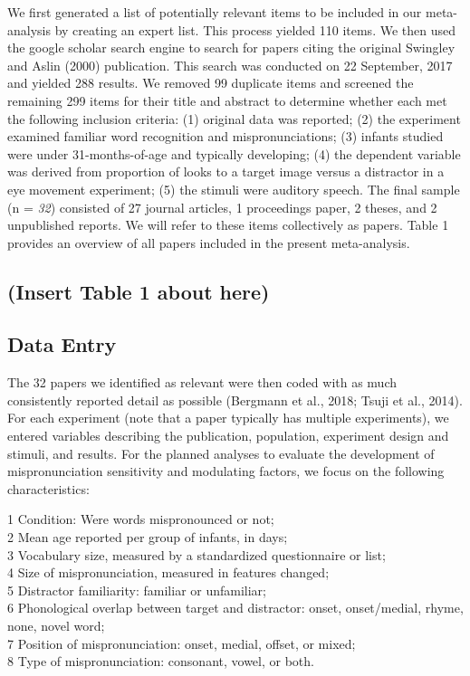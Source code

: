 \documentclass[man]{apa6}
\theoremstyle{definition}
\theoremstyle{definition}
\theoremstyle{definition}
\theoremstyle{remark}
\begin{document}
We first generated a list of potentially relevant items to be included
in our meta-analysis by creating an expert list. This process yielded
110 items. We then used the google scholar search engine to search for
papers citing the original Swingley and Aslin (2000) publication. This
search was conducted on 22 September, 2017 and yielded 288 results. We
removed 99 duplicate items and screened the remaining 299 items for
their title and abstract to determine whether each met the following
inclusion criteria: (1) original data was reported; (2) the experiment
examined familiar word recognition and mispronunciations; (3) infants
studied were under 31-months-of-age and typically developing; (4) the
dependent variable was derived from proportion of looks to a target
image versus a distractor in a eye movement experiment; (5) the stimuli
were auditory speech. The final sample (n = \emph{32}) consisted of 27
journal articles, 1 proceedings paper, 2 theses, and 2 unpublished
reports. We will refer to these items collectively as papers. Table 1
provides an overview of all papers included in the present
meta-analysis.

\subsection{(Insert Table 1 about
here)}\label{insert-table-1-about-here}

\subsection{Data Entry}\label{data-entry}

The 32 papers we identified as relevant were then coded with as much
consistently reported detail as possible (Bergmann et al., 2018; Tsuji
et al., 2014). For each experiment (note that a paper typically has
multiple experiments), we entered variables describing the publication,
population, experiment design and stimuli, and results. For the planned
analyses to evaluate the development of mispronunciation sensitivity and
modulating factors, we focus on the following characteristics:

1 Condition: Were words mispronounced or not;\\
2 Mean age reported per group of infants, in days;\\
3 Vocabulary size, measured by a standardized questionnaire or list;\\
4 Size of mispronunciation, measured in features changed;\\
5 Distractor familiarity: familiar or unfamiliar;\\
6 Phonological overlap between target and distractor: onset,
onset/medial, rhyme, none, novel word;\\
7 Position of mispronunciation: onset, medial, offset, or mixed;\\
8 Type of mispronunciation: consonant, vowel, or both.
\end{document}
